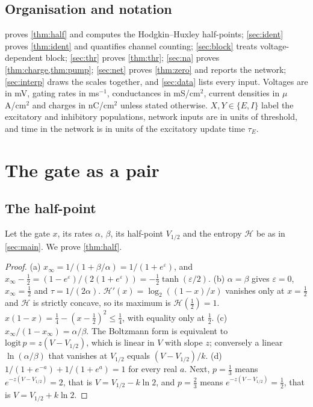 \documentclass[11pt]{article}
\theoremstyle{definition}\newtheorem{definition}[theorem]{Definition}
\theoremstyle{remark}\newtheorem{remark}[theorem]{Remark}
\begin{document}
\subsection{Organisation and notation}
 proves \cref{thm:half} and computes the Hodgkin--Huxley half-points; \cref{sec:ident} proves \cref{thm:ident} and quantifies channel counting; \cref{sec:block} treats voltage-dependent block; \cref{sec:thr} proves \cref{thm:thr}; \cref{sec:na} proves \cref{thm:charge,thm:pump}; \cref{sec:net} proves \cref{thm:zero} and reports the network; \cref{sec:interp} draws the scales together, and \cref{sec:data} lists every input. Voltages are in mV, gating rates in ms$^{-1}$, conductances in mS/cm$^2$, current densities in $\mu$A/cm$^2$ and charges in nC/cm$^2$ unless stated otherwise. $X,Y\in\{E,I\}$ label the excitatory and inhibitory populations, network inputs are in units of threshold, and time in the network is in units of the excitatory update time $\tau_E$.

\section{The gate as a pair}\label{sec:gate}
\subsection{The half-point}
Let the gate $x$, its rates $\alpha$, $\beta$, its half-point $V_{1/2}$ and the entropy $\mathcal H$ be as in \cref{sec:main}. We prove \cref{thm:half}.
\begin{proof}
(a) $x_\infty=1/(1+\beta/\alpha)=1/(1+e^{\varepsilon})$, and $x_\infty-\frac12=(1-e^{\varepsilon})/(2(1+e^{\varepsilon}))=-\frac12\tanh(\varepsilon/2)$. (b) $\alpha=\beta$ gives $\varepsilon=0$, $x_\infty=\frac12$ and $\tau=1/(2\alpha)$. $\mathcal H'(x)=\log_2((1-x)/x)$ vanishes only at $x=\frac12$ and $\mathcal H$ is strictly concave, so its maximum is $\mathcal H(\frac12)=1$. $x(1-x)=\frac14-(x-\frac12)^2\le\frac14$, with equality only at $\frac12$. (c) $x_\infty/(1-x_\infty)=\alpha/\beta$. The Boltzmann form is equivalent to $\mathrm{logit}\,p=z(V-V_{1/2})$, which is linear in $V$ with slope $z$; conversely a linear $\ln(\alpha/\beta)$ that vanishes at $V_{1/2}$ equals $(V-V_{1/2})/k$. (d) $1/(1+e^{-a})+1/(1+e^{a})=1$ for every real $a$. Next, $p=\frac13$ means $e^{-z(V-V_{1/2})}=2$, that is $V=V_{1/2}-k\ln2$, and $p=\frac23$ means $e^{-z(V-V_{1/2})}=\frac12$, that is $V=V_{1/2}+k\ln2$.
\end{proof}
\end{document}
